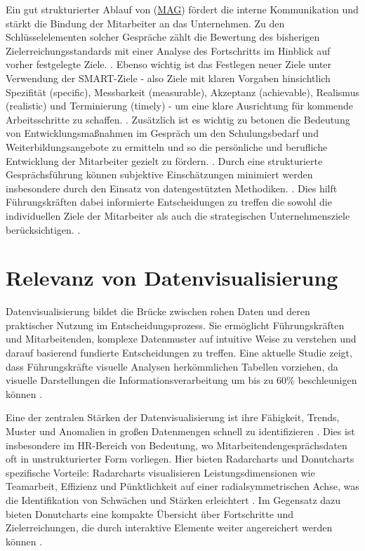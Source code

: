 Ein gut strukturierter Ablauf von (\hyperref[abkuerzungen]{MAG}) fördert die interne Kommunikation und stärkt die Bindung der Mitarbeiter an das Unternehmen. Zu den Schlüsselelementen solcher Gespräche zählt die Bewertung des bisherigen Zielerreichungsstandards mit einer Analyse des Fortschritts im Hinblick auf vorher festgelegte Ziele.  \cite{duarte2012performance}. Ebenso wichtig ist das Festlegen neuer Ziele unter Verwendung der SMART-Ziele - also Ziele mit klaren Vorgaben hinsichtlich Spezifität (specific), Messbarkeit (measurable), Akzeptanz (achievable), Realismus (realistic) und Terminierung (timely) - um eine klare Ausrichtung für kommende Arbeitsschritte zu schaffen.  \cite{duarte2012performance}. Zusätzlich ist es wichtig zu betonen die Bedeutung von Entwicklungsmaßnahmen im Gespräch um den Schulungsbedarf und Weiterbildungsangebote zu ermitteln und so die persönliche und berufliche Entwicklung der Mitarbeiter gezielt zu fördern. \cite{bryson2011employee}. Durch eine strukturierte Gesprächsführung können subjektive Einschätzungen minimiert werden insbesondere durch den Einsatz von datengestützten Methodiken. \cite{heikkila2018}. Dies hilft Führungskräften dabei informierte Entscheidungen zu treffen die sowohl die individuellen Ziele der Mitarbeiter als auch die strategischen Unternehmensziele berücksichtigen. \cite{barton2012}.


\section{Relevanz von Datenvisualisierung}
Datenvisualisierung bildet die Brücke zwischen rohen Daten und deren praktischer Nutzung im Entscheidungsprozess. Sie ermöglicht Führungskräften und Mitarbeitenden, komplexe Datenmuster auf intuitive Weise zu verstehen und darauf basierend fundierte Entscheidungen zu treffen. Eine aktuelle Studie zeigt, dass Führungskräfte visuelle Analysen herkömmlichen Tabellen vorziehen, da visuelle Darstellungen die Informationsverarbeitung um bis zu 60\% beschleunigen können \cite{saket2017task}.

Eine der zentralen Stärken der Datenvisualisierung ist ihre Fähigkeit, Trends, Muster und Anomalien in großen Datenmengen schnell zu identifizieren \cite{kirk2016data}. Dies ist insbesondere im HR-Bereich von Bedeutung, wo Mitarbeitendengesprächsdaten oft in unstrukturierter Form vorliegen. Hier bieten Radarcharts und Donutcharts spezifische Vorteile: Radarcharts visualisieren Leistungsdimensionen wie Teamarbeit, Effizienz und Pünktlichkeit auf einer radialsymmetrischen Achse, was die Identifikation von Schwächen und Stärken erleichtert \cite{heikkila2018}. Im Gegensatz dazu bieten Donutcharts eine kompakte Übersicht über Fortschritte und Zielerreichungen, die durch interaktive Elemente weiter angereichert werden können \cite{evergreen2016effective}.

